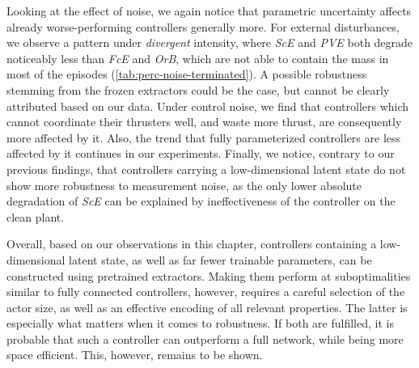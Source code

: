 Looking at the effect of noise, we again notice that parametric uncertainty affects already worse-performing
controllers generally more. For external disturbances, we observe a pattern under \emph{divergent} intensity, where \emph{ScE} and \emph{PVE} both
degrade noticeably less than \emph{FcE} and \emph{OrB}, which are not able to contain the mass in most of the episodes (\cref{tab:perc-noise-terminated}). A possible robustness
stemming from the frozen extractors could be the case, but cannot be clearly attributed based on our data.
Under control noise, we find that controllers which cannot coordinate their thrusters well, and waste more thrust,
are consequently more affected by it. Also, the trend that fully parameterized controllers are less affected by it
continues in our experiments. Finally, we notice, contrary to our previous findings, that controllers carrying a low-dimensional latent state
do not show more robustness to measurement noise, as the only lower absolute degradation of \emph{ScE} can be explained by ineffectiveness of the
controller on the clean plant.

Overall, based on our observations in this chapter, controllers containing a low-dimensional latent state,
as well as far fewer trainable parameters, can be constructed using pretrained extractors. Making them perform
at suboptimalities similar to fully connected controllers, however, requires a careful selection of the actor size,
as well as an effective encoding of all relevant properties. The latter is especially what matters when it comes
to robustness. If both are fulfilled, it is probable that such a controller can outperform a full network, while being
more space efficient. This, however, remains to be shown.